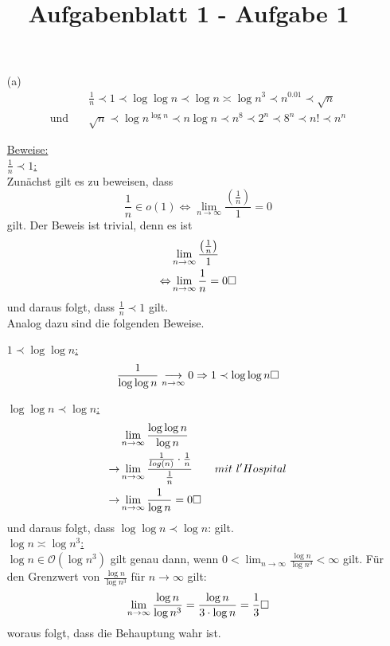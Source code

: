 \documentclass{article}
\title{Aufgabenblatt 1 - Aufgabe 1}
\author{}
\begin{document}
\maketitle

\begin{enumerate}
\item[(a)]
    \begin{align*}
        &\frac{1}{n} \prec 1 \prec \log \log n \prec \log n \asymp \log n^3 \prec
        n^{0.01} \prec \sqrt{n}  \\
        \text{und} \quad &\sqrt{n} \prec \log n^{\log n} \prec n \log n \prec n^8 \prec 
        2^n \prec 8^n \prec n! \prec n^n
    \end{align*}


\underline{Beweise:}\\
\underline{$\frac{1}{n} \prec 1$:} \\
Zunächst gilt es zu beweisen, dass
\[
    \frac{1}{n} \in o(1) \Leftrightarrow \lim_{n \to \infty}
    \frac{\left( \frac{1}{n} \right)}{1} = 0
\]
gilt. Der Beweis ist trivial, denn es ist
\begin{align*}
    &\lim_{n \to \infty} \frac{\left( \frac{1}{n} \right)}{1} \\
    \Leftrightarrow &\lim_{n \to \infty} \frac{1}{n} = 0 \hfill \square
\end{align*}
und daraus folgt, dass $\frac{1}{n} \prec 1$ gilt.\\
Analog dazu sind die folgenden Beweise.

\underline{$1 \prec \log \log n$:}
\[
    \frac{1}{\log \log n} \underset{n \to \infty}{\longrightarrow} 0 \Rightarrow
    1 \prec \log \log n \hfill \square
\]

\underline{$\log \log n \prec \log n$:} \\ %
\begin{align*}
    &\lim_{n \to \infty} \frac{\log \log n }{\log n} \\
    \rightarrow &\lim_{n \to \infty} \frac{\frac{1}{log(n)} \cdot \frac{1}{n}}{\frac{1}{n}} \qquad mit ~ l'Hospital \\
    \rightarrow &\lim_{n \to \infty} \frac{1}{\log n} = 0 \hfill \square
\end{align*}
und daraus folgt, dass {$\log \log n \prec \log n$:} gilt.\\

\underline{$\log n \asymp \log n^3$:}\\
$\log n \in \mathcal{O}(\log n^3)$ gilt genau dann, wenn $0 < \lim_{n \to \infty} \frac{\log
n}{\log n^3} < \infty$ gilt. Für den Grenzwert von $\frac{\log n}{\log n^3}$ für
$n \to \infty$ gilt:
\[
    \lim_{n \to \infty} \frac{\log n}{\log n^3} = \frac{\log n}{3 \cdot \log n}
    = \frac{1}{3} \hfill \square
\]
woraus folgt, dass die Behauptung wahr ist.


\end{enumerate}
\end{document}
